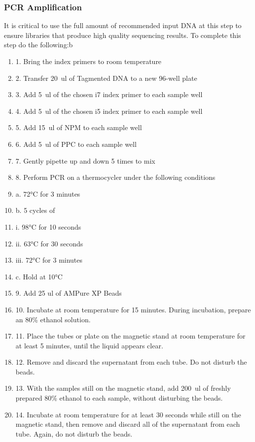 \documentclass[graybox]{svmult}
\begin{document}
\subsubsection{PCR Amplification}
It is critical to use the full amount of recommended input DNA at this step to ensure libraries that produce high quality sequencing results. To complete this step do the following:b\\
\begin{enumerate}
\item{1.      Bring the index primers to room temperature}
\item{2.      Transfer 20~ul of Tagmented DNA to a new 96-well plate}
\item{3.      Add 5~ul of the chosen i7 index primer to each sample well}
\item{4.      Add 5~ul of the chosen i5 index primer to each sample well}
\item{5.      Add 15~ul of NPM to each sample well}
\item{6.      Add 5~ul of PPC to each sample well}
\item{7.      Gently pipette up and down 5 times to mix}
\item{8.      Perform PCR on a thermocycler under the following conditions}
\item{a.      72°C for 3 minutes}
\item{b.      5 cycles of}
\item{i.      98°C for 10 seconds}
\item{ii.     63°C for 30 seconds}
\item{iii.    72°C for 3 minutes}
\item{c.      Hold at 10°C}
\item{9.      Add 25 ul of AMPure XP Beads}
\item{10.     Incubate at room temperature for 15 minutes. During incubation, prepare an 80\% ethanol solution.}
\item{11.     Place the tubes or plate on the magnetic stand at room temperature for at least 5 minutes, until the liquid appears clear.}
\item{12.     Remove and discard the supernatant from each tube. Do not disturb the beads.}
\item{13.     With the samples still on the magnetic stand, add 200~ul of freshly prepared 80\% ethanol to each sample, without disturbing the beads.}
\item{14.     Incubate at room temperature for at least 30 seconds while still on the magnetic stand, then remove and discard all of the supernatant from each tube. Again, do not disturb the beads.}

\end{enumerate}
\end{document}

